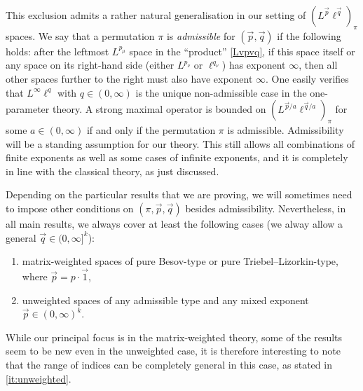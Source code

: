 \documentclass[11pt, reqno]{amsart}
\theoremstyle{definition}
\theoremstyle{remark}
\numberwithin{equation}{section}
\newcommand{\vone}{\vec 1}
\newcommand{\vp}{\vec p}
\newcommand{\vq}{\vec q}
\begin{document}
This exclusion admits a rather natural generalisation in our setting of $(L^{\vp}\ell^{\vq})_\pi$ spaces. We say that a permutation $\pi$ is {\em admissible} for $(\vp,\vq)$ if the following holds: after the leftmost $L^{p_\mu}$ space in the ``product'' \eqref{Lvpvq}, if this space itself or any space on its right-hand side (either $L^{p_\nu}$ or $\ell^{q_\nu}$) has exponent $\infty$, then all other spaces further to the right must also have exponent $\infty$. One easily verifies that $L^\infty\ell^q$ with $q\in(0,\infty)$ is the unique non-admissible case in the one-parameter theory.
A strong maximal operator is bounded on $(L^{\vp/a}\ell^{\vq/a})_\pi$
for some $a\in(0,\infty)$ if and only if the permutation $\pi$ is admissible.
Admissibility will be a standing assumption for our theory. This still allows
all combinations of finite exponents as well as some cases of infinite exponents,
and it is completely in line with the classical theory, as just discussed.

Depending on the particular results that we are proving, we will sometimes need
to impose other conditions on $(\pi,\vp,\vq)$ besides admissibility. Nevertheless, in all main results, we always cover at least the following cases (we alway allow a general $\vq\in(0,\infty]^k$):
\begin{enumerate}[\rm(i)]
  \item matrix-weighted spaces of pure Besov-type or pure Triebel--Lizorkin-type, where $\vp=p\cdot\vone$,
  \item\label{it:unweighted} unweighted spaces of any admissible type and any mixed exponent $\vp\in(0,\infty)^k$.
\end{enumerate}
While our principal focus is in the matrix-weighted theory, some of the results seem to be new even in the unweighted case, it is therefore interesting to note that the range of indices can be completely general in this case, as stated in \eqref{it:unweighted}.
\end{document}
